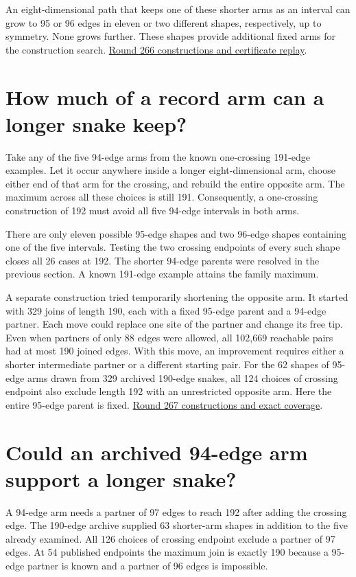 \documentclass[11pt,a4paper]{article}
\begin{document}
An eight-dimensional path that keeps one of these shorter arms as an
interval can grow to 95 or 96 edges in eleven or two different shapes,
respectively, up to symmetry. None grows further. These shapes provide
additional fixed arms for the construction search.
\href{https://github.com/hironaka-iori/Snake-in-the-box-in-9/tree/main/milestones/266-rebuilding-one-arm}{Round 266 constructions and certificate replay}.

\section{How much of a record arm can a longer snake keep?}
Take any of the five 94-edge arms from the known one-crossing 191-edge
examples. Let it occur anywhere inside a longer eight-dimensional arm,
choose either end of that arm for the crossing, and rebuild the entire
opposite arm. The maximum across all these choices is still 191.
Consequently, a one-crossing construction of 192 must avoid all five
94-edge intervals in both arms.

There are only eleven possible 95-edge shapes and two 96-edge shapes
containing one of the five intervals. Testing the two crossing endpoints
of every such shape closes all 26 cases at 192. The shorter 94-edge
parents were resolved in the previous section. A known 191-edge example
attains the family maximum.

A separate construction tried temporarily shortening the opposite arm.
It started with 329 joins of length 190, each with a fixed 95-edge
parent and a 94-edge partner. Each move could replace one site of the
partner and change its free tip. Even when partners of only 88 edges
were allowed, all 102,669 reachable pairs had at most 190 joined edges.
With this move, an improvement requires either a shorter intermediate
partner or a different starting pair.
For the 62 shapes of 95-edge arms drawn from 329 archived 190-edge snakes, all 124 choices of crossing endpoint also exclude length 192 with an unrestricted opposite arm. Here the entire 95-edge parent is fixed.
\href{https://github.com/hironaka-iori/Snake-in-the-box-in-9/tree/main/milestones/267-fixed-arm-extensions}{Round 267 constructions and exact coverage}.

\section{Could an archived 94-edge arm support a longer snake?}
A 94-edge arm needs a partner of 97 edges to reach 192 after adding the
crossing edge. The 190-edge archive supplied 63 shorter-arm shapes in
addition to the five already examined. All 126 choices of crossing endpoint exclude a partner of 97 edges. At 54 published endpoints the maximum join is exactly 190 because a 95-edge partner is known and a partner of 96 edges is impossible.
\end{document}
